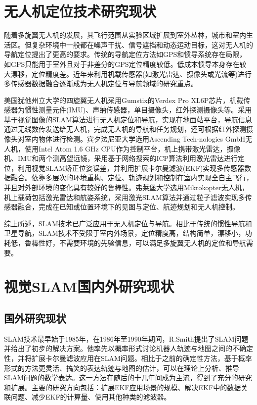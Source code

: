 \section{无人机定位技术研究现状}
随着多旋翼无人机的发展，其飞行范围从实验区域扩展到室外丛林，城市和室内生活区。但复杂环境中一般都在噪声干扰、信号遮挡和动态运动目标，这对无人机的导航定位提出了更高的要求。传统的导航定位方法如GPS和惯导系统存在局限，如GPS只能用于室外且对于非差分的GPS定位精度较低。低成本惯导本身存在较大漂移，定位精度差。近年来利用机载传感器(如激光雷达、摄像头或光流等)进行多传感器数据融合逐渐成为无人机定位与导航领域的研究重点。

美国犹他州立大学\upcite{[1.3]}的四旋翼无人机采用Gumstix的Verdex Pro XL6P芯片，机载传感器为惯性测量元件(IMU)、声纳传感器，单目摄像头，红外探测摄像头等。采用基于视觉图像的SLAM算法进行无人机定位和导航，实现在地面站平台，导航信息通过无线数传发送给无人机，完成无人机的导航和任务规划，还可根据红外探测摄像头对室内物体进行检测。宾夕法尼亚大学\upcite{[1.4]}选用Ascending Tech-nologies GmbH无人机，使用Intel Atom 1.6 GHz CPU作为控制平台，机上携带激光雷达，摄像机、IMU和两个测高望远镜，采用基于网络搜索的ICP算法利用激光雷达进行定位，利用视觉SLAM矫正位姿误差，并利用扩展卡尔曼滤波(EKF)实现多传感器数据融合。依靠多层次的环境重构、定位、轨迹规划和控制在室内实现全自主飞行，并且对外部环境的变化具有较好的鲁棒性。弗莱堡大学\upcite{[1.5]}选用Mikrokopter无人机，机上载荷包括激光雷达和航姿系统，采用激光SLAM算法并通过粒子滤波实现多传感器融合，完成在已知或位置环境下的见图与定位、航迹规划和无人机控制。

综上所述，SLAM技术已广泛应用于无人机定位与导航。相比于传统的惯性导航和卫星导航，SLAM技术不受限于室内外场景，定位精度高，结构简单，漂移小，功耗低，鲁棒性好，不需要环境的先验信息，可以满足多旋翼无人机的定位和导航需要。

\section{视觉SLAM国内外研究现状}
\subsection{国外研究现状}
SLAM技术最早始于1985年\upcite{[1.6]}，在1986年至1990年期间，R.Smith提出了SLAM问题并给出了初步的解决方案\upcite{[1.7]}。他率先以概率形式讨论机器人轨迹与地图之间的不确定性，并将扩展卡尔曼滤波应用在SLAM问题。相比于之前的确定性方法，基于概率形式的方法更灵活、搞笑的表达轨迹与地图的估计，可以在理论上分析、推导SLAM问题的数学表达。这一方法在随后的十几年间成为主流，得到了充分的研究和扩展\upcite{}。主要的研究方向包括：扩展EKF应用场景的规模\upcite{}、解决EKF中的数据关联问题\upcite{}、减少EKF的计算量\upcite{}、使用其他种类的滤波器\upcite{}。

